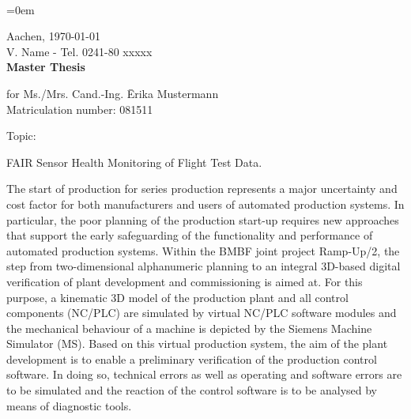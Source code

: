 \pagestyle{empty}
~
\newpage
{}
\parindent=0em

Aachen, \verbosedate\today\\
V. Name - Tel. 0241-80 xxxxx\\[2cm]

{\huge \bf Master Thesis}\\[1cm] %


\begin{tabbing}
for Ms./Mrs. Cand.-Ing. \quad \= Erika Mustermann\\
\> Matriculation number: 081511\\

	
\end{tabbing}

\begin{minipage}[t]{0.1\textwidth}
Topic: %
\quad
\end{minipage}
\begin{minipage}[t]{0.9\textwidth}
	FAIR Sensor Health Monitoring of Flight Test Data.\\
\end{minipage}

The start of production for series production represents a major uncertainty and cost factor for both manufacturers and users of automated production systems. In particular, the poor planning of the production start-up requires new approaches that support the early safeguarding of the functionality and performance of automated production systems. Within the BMBF joint project Ramp-Up/2, the step from two-dimensional alphanumeric planning to an integral 3D-based digital verification of plant development and commissioning is aimed at. For this purpose, a kinematic 3D model of the production plant and all control components (NC/PLC) are simulated by virtual NC/PLC software modules and the mechanical behaviour of a machine is depicted by the Siemens Machine Simulator (MS). Based on this virtual production system, the aim of the plant development is to enable a preliminary verification of the production control software. In doing so, technical errors as well as operating and software errors are to be simulated and the reaction of the control software is to be analysed by means of diagnostic tools.

